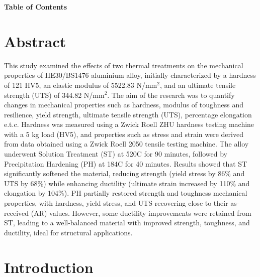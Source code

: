 \documentclass{article}
\begin{document}
    \normalsize
    \newpage{}
    \noindent\vspace{0em}
    \begin{center}
        \LARGE \textbf{Table of Contents}\\[-7em]
    \end{center}
    {
        \hypersetup{linkcolor=black}
        \tableofcontents
    }    


    \large\newpage\restoregeometry\vspace*{-20pt}

    \section{Abstract}
    \vspace*{1em}
    This study examined the effects of two thermal treatments on the mechanical properties of HE30/BS1476 aluminium alloy, initially characterized by a hardness of 121 HV5, an elastic modulus of 5522.83 N/\(\text{mm}^2\), and an ultimate tensile strength (UTS) of 344.82 N/\(\text{mm}^2\). The aim of the research was to quantify changes in mechanical properties such as hardness, modulus of toughness and resilience, yield strength, ultimate tensile strength (UTS), percentage elongation e.t.c. Hardness was measured using a Zwick Roell ZHU hardness testing machine with a 5 kg load (HV5), and properties such as stress and strain were derived from data obtained using a Zwick Roell 2050 tensile testing machine. The alloy underwent Solution Treatment (ST) at 520\textdegree C for 90 minutes, followed by Precipitation Hardening (PH) at 184\textdegree C for 40 minutes. Results showed that ST significantly softened the material, reducing strength (yield stress by 86\% and UTS by 68\%) while enhancing ductility (ultimate strain increased by 110\% and elongation by 104\%). PH partially restored strength and toughness mechanical properties, with hardness, yield stress, and UTS recovering close to their as-received (AR) values. However, some ductility improvements were retained from ST, leading to a well-balanced material with improved strength, toughness, and ductility, ideal for structural applications.
   
    
    \newpage\vspace*{-20pt}
\section{Introduction}
\end{document}
